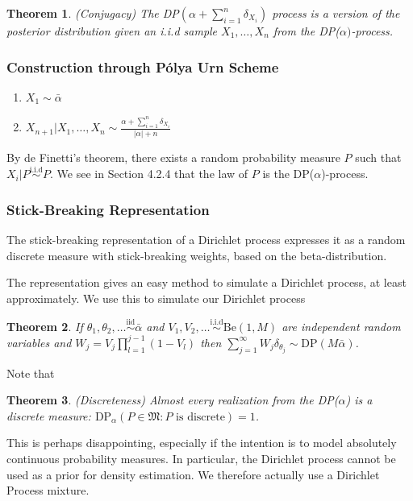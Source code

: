 \documentclass[a4paper,11pt]{article}
\theoremstyle{theorem}
\newtheorem{thm}{Theorem}
\theoremstyle{definition}
\theoremstyle{remark}
\begin{document}
\begin{thm}
(Conjugacy) The DP$\left(\alpha + \sum_{i=1}^{n}{\delta_{X_i}}\right)$ process is a version of the posterior distribution given an i.i.d sample $X_1, \dotsc, X_n$ from the DP($\alpha)$-process.
\end{thm}

\subsubsection{Construction through P\'{o}lya Urn Scheme}

\begin{enumerate}
\item $X_1 \sim \bar{\alpha}$
\item $X_{n+1} | X_1, \dotsc, X_n \sim \frac{\alpha + \sum_{i=1}^{n}{\delta_{X_i}}}{|\alpha| + n}$
\end{enumerate}

By de Finetti's theorem, there exists a random probability measure $P$ such that $X_i | P \overset{\text{i.i.d}}{\sim} P$. We see in Section 4.2.4 that the law of $P$ is the DP($\alpha$)-process.

\subsubsection{Stick-Breaking Representation}

The stick-breaking representation of a Dirichlet process expresses it as a random discrete measure with stick-breaking weights, based on the beta-distribution.

The representation gives an easy method to simulate a Dirichlet process, at least approximately. We use this to simulate our Dirichlet process

\begin{thm}
If $\theta_1, \theta_2, \dotsc \overset{\text{iid}}{\sim}\bar{\alpha}$ and $V_1, V_2, \dotsc \overset{\text{i.i.d}}{\sim} \text{Be}(1, M)$ are independent random variables and $W_j = V_j\prod_{l=1}^{j-1}{(1-V_l)}$ then $\sum_{j=1}^{\infty}{W_j\delta_{\theta_j}} \sim \text{DP}(M\bar{\alpha})$.
\end{thm}

Note that
\begin{thm}
(Discreteness) Almost every realization from the DP($\alpha$) is a discrete measure: $\text{DP}_{\alpha}(P \in \mathfrak{M}: P \text{ is discrete}) = 1$.
\end{thm}

This is perhaps disappointing, especially if the intention is to model absolutely continuous probability measures. In particular, the Dirichlet process cannot be used as a prior for density estimation. We therefore actually use a Dirichlet Process mixture.
\end{document}
